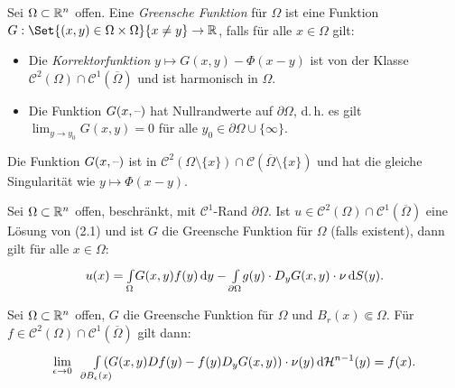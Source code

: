\documentclass{cheat-sheet}
\newcommand{\HM}{\mathcal{H}} %
\begin{document}
\begin{defn}
  Sei $\Omega \subset \mathbb{R}^n$ offen. Eine \emph{Greensche Funktion} für $\Omega$ ist eine Funktion
  $G : \Set{ (x, y) \in \Omega \times \Omega }{ x \not= y } \to \R$, falls für alle $x \in \Omega$ gilt:
  \begin{itemize}
    \item Die \emph{Korrektorfunktion} $y \mapsto G(x, y) - \Phi(x - y)$ ist von der Klasse $\mathcal{C}^2(\Omega) \cap \mathcal{C}^1(\overline{\Omega})$ und ist harmonisch in $\Omega$. %
    \item Die Funktion $G(x, \text{--})$ hat Nullrandwerte auf $\partial \Omega$, d.\,h. es gilt $\lim_{y \to y_0} G(x, y) = 0$ für alle $y_0 \in \partial \Omega \cup \{ \infty \}$.
  \end{itemize}
\end{defn}


\begin{bem}
  Die Funktion $G(x, \text{--})$ ist in $\mathcal{C}^2(\Omega \setminus \{ x \}) \cap \mathcal{C}(\overline{\Omega} \setminus \{ x \})$ und hat die gleiche Singularität wie $y \mapsto \Phi(x - y)$.
\end{bem}


\begin{satz}
  Sei $\Omega \subset \mathbb{R}^n$ offen, beschränkt, mit $\mathcal{C}^1$-Rand $\partial \Omega$. Ist $u \in \mathcal{C}^2(\Omega) \cap \mathcal{C}^1(\overline{\Omega})$ eine Lösung von (2.1) und ist $G$ die Greensche Funktion für $\Omega$ (falls existent), dann gilt für alle $x \in \Omega$:
  \[ u(x) = {\textstyle \int\limits_{\Omega}^{}} G(x,y) f(y) \,\mathrm{d} y - {\textstyle \int\limits_{\partial \Omega}^{}} g(y) \cdot D_y G(x,y) \cdot \nu \,\mathrm{d} S(y). \]
\end{satz}


\begin{lem}
  Sei $\Omega \subset \mathbb{R}^n$ offen, $G$ die Greensche Funktion für $\Omega$ und $B_r(x) \Subset \Omega$. Für $f \in \mathcal{C}^2(\Omega) \cap \mathcal{C}^1(\overline{\Omega})$ gilt dann:
  \[ \lim_{\epsilon \to 0} \quad\enspace \Int{\mathclap{\partial B_{\epsilon}(x)}}{}{\left( G(x, y) Df(y) - f(y) D_y G(x, y) \right) \cdot \nu(y) }{\HM^{n-1}(y)} = f(x). \]
\end{lem}
\end{document}
